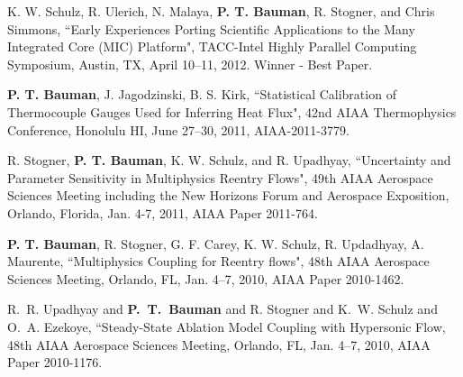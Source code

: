 K. W. Schulz,  R. Ulerich,  N. Malaya, \textbf{P. T. Bauman}, R. Stogner, and Chris Simmons,
``Early Experiences Porting Scientific Applications to the Many Integrated Core (MIC) Platform",
TACC-Intel Highly Parallel Computing Symposium, Austin, TX,
April 10--11, 2012. Winner - Best Paper.

\blankline

\textbf{P. T. Bauman}, J. Jagodzinski, B. S. Kirk,
``Statistical Calibration of Thermocouple Gauges Used for Inferring Heat Flux", 
42nd AIAA Thermophysics Conference, Honolulu HI, June 27--30, 2011, AIAA-2011-3779.

\blankline

R. Stogner, \textbf{P. T. Bauman}, K. W. Schulz, and R. Upadhyay,
``Uncertainty and Parameter Sensitivity in Multiphysics Reentry Flows",
49th AIAA Aerospace Sciences Meeting including the New Horizons Forum and Aerospace Exposition,
Orlando, Florida, Jan. 4-7, 2011, AIAA Paper 2011-764.

\blankline

\textbf{P. T. Bauman}, R. Stogner, G. F. Carey, K. W. Schulz, R. Updadhyay, A. Maurente,
``Multiphysics Coupling for Reentry flows", 48th AIAA Aerospace Sciences Meeting,
Orlando, FL, Jan. 4--7, 2010, AIAA Paper 2010-1462.

\blankline

R.~R. Upadhyay and \textbf{P.~T.~Bauman} and R. Stogner and K.~W. Schulz and O.~A. Ezekoye, 
``Steady-State Ablation Model Coupling with Hypersonic Flow, 48th AIAA Aerospace Sciences Meeting,
Orlando, FL, Jan. 4--7, 2010, AIAA Paper 2010-1176.
